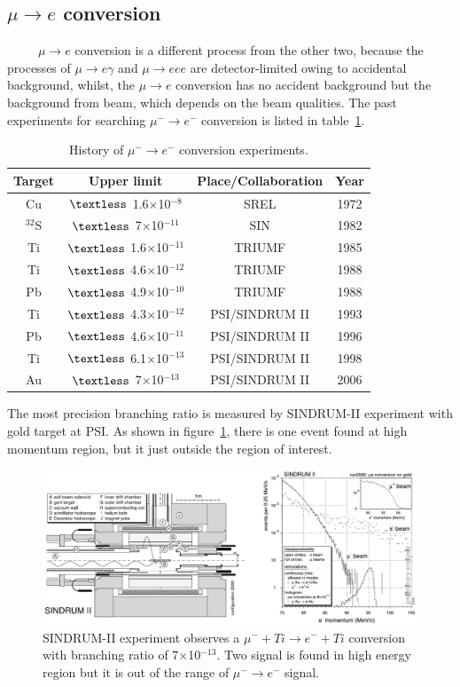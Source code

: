 \subsection{$\mu \rightarrow e$ conversion}
~~~~~$\mu \rightarrow e$ conversion is a different process from the other two, because the processes of $\mu \rightarrow e\gamma$ and $\mu \rightarrow eee$ are detector-limited owing to accidental background, whilst, the $\mu \rightarrow e$ conversion has no accident background but the background from beam, which depends on the beam qualities.
The past experiments for searching $\mu^- \rightarrow e^-$ conversion is listed in table~\ref{muehis}.
\begin{table}[H]
 \centering
 \begin{tabular}{cccc} \hline \hline
  Target & Upper limit & Place/Collaboration & Year \\ \hline
  Cu & $\textless$ 1.6$\times$10$^{-8}$ & SREL & 1972 \\
  $^{32}$S & $\textless$ 7$\times$10$^{-11}$ & SIN & 1982 \\
  Ti & $\textless$ 1.6$\times$10$^{-11}$ & TRIUMF & 1985 \\
  Ti & $\textless$ 4.6$\times$10$^{-12}$ & TRIUMF & 1988 \\
  Pb & $\textless$ 4.9$\times$10$^{-10}$ & TRIUMF & 1988 \\
  Ti & $\textless$ 4.3$\times$10$^{-12}$ & PSI/SINDRUM II & 1993 \\
  Pb & $\textless$ 4.6$\times$10$^{-11}$ & PSI/SINDRUM II & 1996 \\
  Ti & $\textless$ 6.1$\times$10$^{-13}$ & PSI/SINDRUM II & 1998 \\
  Au & $\textless$ 7$\times$10$^{-13}$ & PSI/SINDRUM II & 2006 \\ \hline \hline
 \end{tabular}
 \caption{History of $\mu^- \rightarrow e^-$ conversion experiments.}
 \label{muehis}
\end{table}
The most precision branching ratio is measured by SINDRUM-II experiment with gold target at PSI.
As shown in figure~\ref{sind}, there is one event found at high momentum region, but it just outside the region of interest.
\begin{figure}[H]
 \centering
 \includegraphics[scale=0.5]{chapter1/fig/sindrum.pdf}
 \caption{SINDRUM-II experiment observes a $\mu^- + Ti \rightarrow e^- + Ti$ conversion with branching ratio of 7$\times$10$^{-13}$. Two signal is found in high energy region but it is out of the range of $\mu^- \rightarrow e^-$ signal.}
 \label{sind}
\end{figure}
